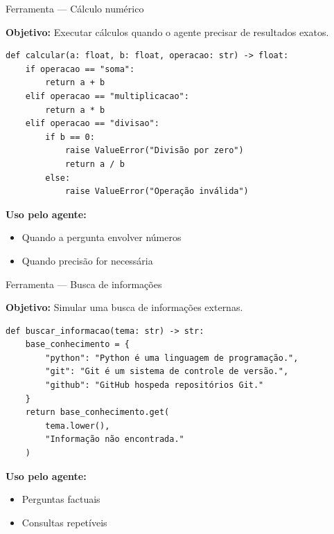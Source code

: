\documentclass{beamer}
\begin{document}
\begin{frame}[fragile]{Ferramenta — Cálculo numérico}
    
    \textbf{Objetivo:}  
    Executar cálculos quando o agente precisar de resultados exatos.
    
    \begin{verbatim}
def calcular(a: float, b: float, operacao: str) -> float:
    if operacao == "soma":
        return a + b
    elif operacao == "multiplicacao":
        return a * b
    elif operacao == "divisao":
        if b == 0:
            raise ValueError("Divisão por zero")
            return a / b
        else:
            raise ValueError("Operação inválida")
    \end{verbatim}
    
    \vspace{0.3cm}
    
    \textbf{Uso pelo agente:}
    \begin{itemize}
        \item Quando a pergunta envolver números
        \item Quando precisão for necessária
    \end{itemize}
    
\end{frame}

\begin{frame}[fragile]{Ferramenta — Busca de informações}
    
    \textbf{Objetivo:}  
    Simular uma busca de informações externas.
    
    \begin{verbatim}
def buscar_informacao(tema: str) -> str:
    base_conhecimento = {
        "python": "Python é uma linguagem de programação.",
        "git": "Git é um sistema de controle de versão.",
        "github": "GitHub hospeda repositórios Git."
    }
    return base_conhecimento.get(
        tema.lower(),
        "Informação não encontrada."
    )
    \end{verbatim}
    
    \vspace{0.3cm}
    
    \textbf{Uso pelo agente:}
    \begin{itemize}
        \item Perguntas factuais
        \item Consultas repetíveis
    \end{itemize}
    
\end{frame}
\end{document}
